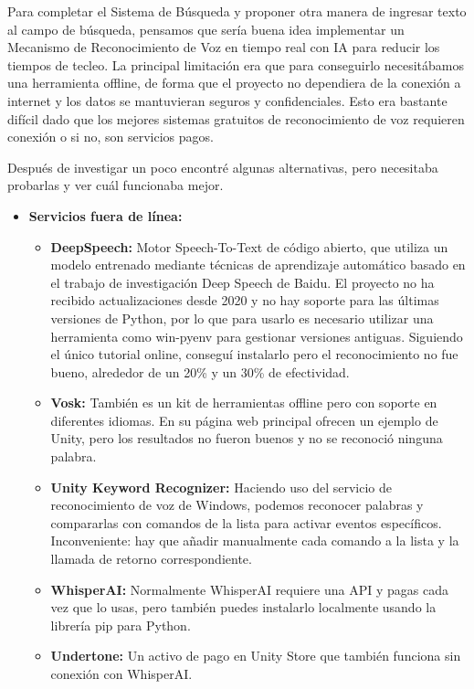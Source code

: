 Para completar el Sistema de Búsqueda y proponer otra manera de ingresar texto al campo de búsqueda, pensamos que sería buena idea implementar un Mecanismo de Reconocimiento de Voz en tiempo real con IA para reducir los tiempos de tecleo. La principal limitación era que para conseguirlo necesitábamos una herramienta offline, de forma que el proyecto no dependiera de la conexión a internet y los datos se mantuvieran seguros y confidenciales.
Esto era bastante difícil dado que los mejores sistemas gratuitos de reconocimiento de voz requieren conexión o si no, son servicios pagos.

Después de investigar un poco encontré algunas alternativas, pero necesitaba probarlas y ver cuál funcionaba mejor.
\begin{itemize}
   \item \textbf{Servicios fuera de línea:}
   \begin{itemize}
      \item \textbf{DeepSpeech:}
      Motor Speech-To-Text de código abierto, que utiliza un modelo entrenado mediante técnicas de aprendizaje automático basado en el trabajo de investigación Deep Speech de Baidu. El proyecto no ha recibido actualizaciones desde 2020 y no hay soporte para las últimas versiones de Python, por lo que para usarlo es necesario utilizar una herramienta como win-pyenv para gestionar versiones antiguas. Siguiendo el único tutorial online, conseguí instalarlo pero el reconocimiento no fue bueno, alrededor de un 20\% y un 30\% de efectividad.
      \item \textbf{Vosk:}
      También es un kit de herramientas offline pero con soporte en diferentes idiomas. En su página web principal ofrecen un ejemplo de Unity, pero los resultados no fueron buenos y no se reconoció ninguna palabra.
      \item \textbf{Unity Keyword Recognizer:}
      Haciendo uso del servicio de reconocimiento de voz de Windows, podemos reconocer palabras y compararlas con comandos de la lista para activar eventos específicos. Inconveniente: hay que añadir manualmente cada comando a la lista y la llamada de retorno correspondiente.
      \item \textbf{WhisperAI:}
      Normalmente WhisperAI requiere una API y pagas cada vez que lo usas, pero también puedes instalarlo localmente usando la librería pip para Python.
      \item \textbf{Undertone:}
      Un activo de pago en Unity Store que también funciona sin conexión con WhisperAI.   \end{itemize}

\end{itemize}
